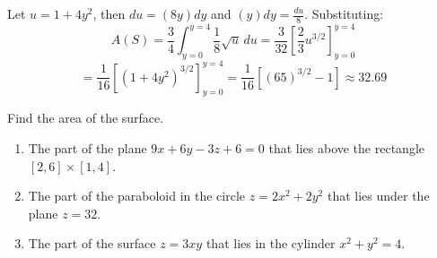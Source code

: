 Let $u = 1 + 4y^2$, then $du = (8y)dy$ and $(y)dy = \frac{du}{8}$. Substituting:
$$A(S) = \frac{3}{4} \int_{y = 0}^{y = 4} \frac{1}{8} \sqrt{u}\,du = \frac{3}{
32} \left[ \frac{2}{3} u^{3/2} \right]_{y = 0}^{y = 4}$$
$$= \frac{1}{16} \left[ \left(1 + 4y^2 \right)^{3/2} \right]_{y = 0}^{y = 4} = 
\frac{1}{16} \left[ \left( 65 \right)^{3/2} - 1 \right] \approx 32.69$$

\begin{Exercise}[title = {Surface Area of Two-Variable Functions}, label = 
surface]
Find the area of the surface.
\begin{enumerate}
\item The part of the plane $9x + 6y - 3z + 6 = 0$ that lies above the 
rectangle $\left[2, 6 \right] \times \left[1, 4 \right]$.
\item The part of the paraboloid in the circle $z = 2x^2 + 2y^2$ that lies 
under the plane $z = 32$. 
\item The part of the surface $z = 3xy$ that lies in the cylinder $x^2 + y^2 
= 4$.
\end{enumerate}
\end{Exercise}

